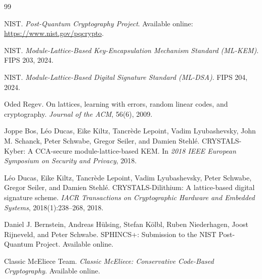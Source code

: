 ﻿\documentclass[12pt,a4paper]{ctexart}
\numberwithin{equation}{section}
\begin{document}
\begin{thebibliography}{99}

NIST.
\newblock \textit{Post-Quantum Cryptography Project}.
\newblock Available online: \url{https://www.nist.gov/pqcrypto}.

NIST.
\newblock \textit{Module-Lattice-Based Key-Encapsulation Mechanism Standard (ML-KEM)}.
\newblock FIPS 203, 2024.

NIST.
\newblock \textit{Module-Lattice-Based Digital Signature Standard (ML-DSA)}.
\newblock FIPS 204, 2024.

Oded Regev.
\newblock On lattices, learning with errors, random linear codes, and cryptography.
\newblock \textit{Journal of the ACM}, 56(6), 2009.

Joppe Bos, L\'eo Ducas, Eike Kiltz, Tancr\`ede Lepoint, Vadim Lyubashevsky, John M. Schanck, Peter Schwabe, Gregor Seiler, and Damien Stehl\'e.
\newblock CRYSTALS-Kyber: A CCA-secure module-lattice-based KEM.
\newblock In \textit{2018 IEEE European Symposium on Security and Privacy}, 2018.

L\'eo Ducas, Eike Kiltz, Tancr\`ede Lepoint, Vadim Lyubashevsky, Peter Schwabe, Gregor Seiler, and Damien Stehl\'e.
\newblock CRYSTALS-Dilithium: A lattice-based digital signature scheme.
\newblock \textit{IACR Transactions on Cryptographic Hardware and Embedded Systems}, 2018(1):238--268, 2018.

Daniel J. Bernstein, Andreas H\"ulsing, Stefan K\"olbl, Ruben Niederhagen, Joost Rijneveld, and Peter Schwabe.
\newblock SPHINCS+: Submission to the NIST Post-Quantum Project.
\newblock Available online.

Classic McEliece Team.
\newblock \textit{Classic McEliece: Conservative Code-Based Cryptography}.
\newblock Available online.

\end{thebibliography}
\end{document}
